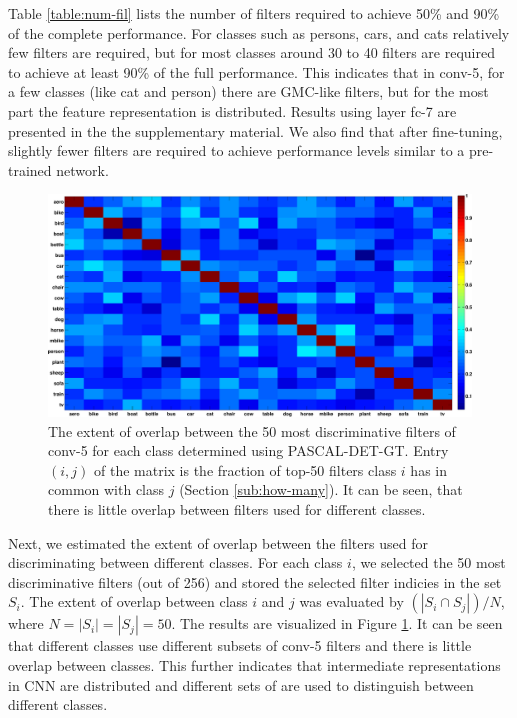 Table \ref{table:num-fil} lists the number of filters required to achieve 50\% and 90\% of the complete performance. For classes such as persons, cars, and cats relatively few filters are required, but for most classes around 30 to 40 filters are required to achieve at least 90\% of the full performance. This indicates that in conv-5, for a few classes (like cat and person) there are GMC-like filters, but for the most part the feature representation is distributed.
Results using layer fc-7 are presented in the the supplementary material.
We also find that after fine-tuning, slightly fewer filters are required to achieve performance levels similar to a pre-trained network. 

\begin{figure}[t!]
\centering
\includegraphics[width=1.0\linewidth]{images/FTNet_overlap.pdf}
\caption{The extent of overlap between the 50 most discriminative filters of conv-5 for each class determined using PASCAL-DET-GT.
Entry $(i, j)$ of the matrix is the fraction of top-50 filters class $i$ has in common with class $j$ (Section \ref{sub:how-many}). It can be seen, that there is little overlap between filters used for different classes.}
\label{fig:overlap}
\end{figure}

Next, we estimated the extent of overlap between the filters used for discriminating between different classes.
For each class $i$, we selected the 50 most discriminative filters (out of 256) and stored the selected filter indicies in the set $S_i$.
The extent of overlap between class $i$ and $j$ was evaluated by $(|S_i \cap S_j|) / N$,
where $N = |S_i| = |S_j| = 50$. The results are visualized in Figure \ref{fig:overlap}. It can be seen that different classes use different subsets of conv-5 filters and there is little overlap between classes. This further indicates that intermediate representations in CNN are distributed and different sets of are used to distinguish between different classes. 

